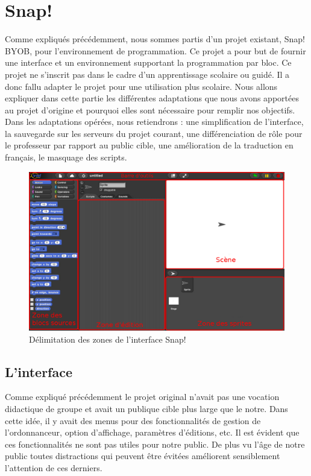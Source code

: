 \section{Snap!}
\label{solution SNAP}
Comme expliqués précédemment, nous sommes partis d'un projet existant, Snap! BYOB, pour l'environnement de programmation. Ce projet a pour but de fournir une interface et un environnement supportant la programmation par bloc. Ce projet ne s'inscrit pas dans le cadre d'un apprentissage scolaire ou guidé. Il a donc fallu adapter le projet pour une utilisation plus scolaire. Nous allons expliquer dans cette partie les différentes adaptations que nous avons apportées au projet d'origine et pourquoi elles sont nécessaire pour remplir nos objectifs.\\

Dans les adaptations opérées, nous retiendrons : une simplification de l'interface, la sauvegarde sur les serveurs du projet courant, une différenciation de rôle pour le professeur par rapport au public cible, une amélioration de la traduction en français, le masquage des scripts.

\begin{figure}[]
  \begin{center}
  \includegraphics[width=\textwidth]{content/7-solution/2-snap/images/interface}
        \caption{Délimitation des zones de l'interface Snap!}
    \label{fig:snap interface}
  \end{center}
\end{figure}

\subsection{L'interface}
\label{interface}
Comme expliqué précédemment le projet original n'avait pas une vocation didactique de groupe et avait un publique cible plus large que le notre. Dans cette idée, il y avait des menus pour des fonctionnalités de gestion de l'ordonnanceur, option d'affichage, paramètres d'éditions, etc. Il est évident que ces fonctionnalités ne sont pas utiles pour notre public. De plus vu l'âge de notre public toutes distractions qui peuvent être évitées améliorent sensiblement l'attention de ces derniers.


